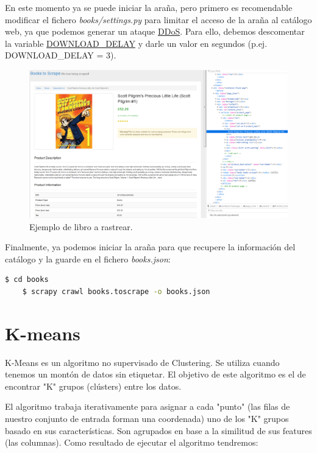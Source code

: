 \documentclass{uimppracticas}
\begin{document}
En este momento ya se puede iniciar la araña, pero primero es recomendable modificar el fichero \textit{books/settings.py} para limitar el acceso de la araña al catálogo web, ya que podemos generar un ataque \href{https://es.wikipedia.org/wiki/Ataque_de_denegaci%C3%B3n_de_servicio}{DDoS}. Para ello, debemos descomentar la variable \href{https://docs.scrapy.org/en/latest/topics/settings.html#download-delay}{DOWNLOAD\_DELAY} y darle un valor en segundos (p.ej. DOWNLOAD\_DELAY = 3). 	
\begin{figure}[h]
	\centering
	\includegraphics[scale=0.35]{images/book}
	\caption{Ejemplo de libro a rastrear.}
	\label{book}
\end{figure}

Finalmente, ya podemos iniciar la araña para que recupere la información del catálogo y la guarde en el fichero \textit{books.json}:

\begin{lstlisting}[language=bash]
	$ cd books
	$ scrapy crawl books.toscrape -o books.json
\end{lstlisting}

\section{K-means}\label{kmeans} 
K-Means es un algoritmo no supervisado de Clustering. Se utiliza cuando tenemos un montón de datos sin etiquetar. El objetivo de este algoritmo es el de encontrar "K" grupos (clústers) entre los datos.

El algoritmo trabaja iterativamente para asignar a cada "punto" (las filas de nuestro conjunto de entrada forman una coordenada) uno de los "K" grupos basado en sus características. Son agrupados en base a la similitud de sus features (las columnas). Como resultado de ejecutar el algoritmo tendremos:
\end{document}
